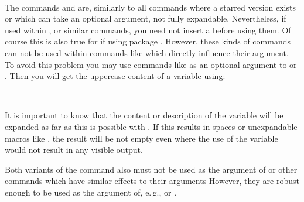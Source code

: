 \begin{Declaration}
  \\
\end{Declaration}
%
%
The commands  and  are, similarly to all
commands where a starred version exists or which can take an optional
argument, not fully expandable. Nevertheless, if used within
,  or
similar commands, you need not insert a 
before using them.  Of course this is also true for
 if using package
. However, these kinds of
commands can not be used within commands like
which directly influence their argument.  To avoid this problem you may use
commands like  as an optional argument to
 or . Then you will get the uppercase
content of a variable using:
\begin{lstcode}[escapeinside=`']
\end{lstcode}
%
%
%

\begin{Declaration}
  \\
\end{Declaration}
%
%
It is important to know that the content or description of the variable will
be expanded as far as this is possible with . If this results in
spaces or unexpandable macros like , the result will be not empty
even where the use of the variable would not result in any visible output.
  
Both variants of the command also must not be used as the
argument of  or other commands
which have similar effects to their arguments However, they are robust enough
to be used as the argument of, e.\,g.,  or .%
%
%
%
%
%


